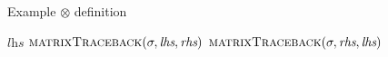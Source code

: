 \documentclass[11pt]{article}
\begin{document}
\begin{algorithm}
  \caption{Example $\otimes$ definition}\label{pairwiseAlignment}
  \begin{algorithmic}[1]
      \newline
        \State \Return $\textit{lhs}$
        \State \Return $\Call{matrixTraceback}{\sigma, \textit{lhs}, \textit{rhs}}$
      \Else
        \State \Return $\Call{matrixTraceback}{\sigma, \textit{rhs}, \textit{lhs}}$
      \EndIf
    \EndFunction  
  \end{algorithmic}
\end{algorithm}
\end{document}
